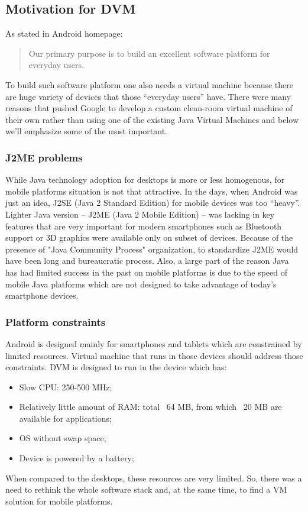 \documentclass[11pt, oneside]{article}   	%
\begin{document}
\subsection{Motivation for DVM}

As stated in Android homepage:
\begin{quotation}
Our primary purpose is to build an excellent software platform for everyday users\cite{website:androidphylosophy}.
\end{quotation}
To build such software platform one also needs a virtual machine because there are huge variety of devices that those ``everyday users'' have. There were many reasons that pushed Google to develop a custom clean-room virtual machine of their own rather than using one of the existing Java Virtual Machines and below we'll emphasize some of the most important.

\subsubsection{J2ME problems}

While Java technology adoption for desktops is more or less homogenous, for mobile platforms situation is not that attractive. In the days, when Android was just an idea, J2SE (Java 2 Standard Edition) for mobile devices was too ``heavy''. Lighter Java version -- J2ME (Java 2 Mobile Edition) -- was lacking in key features that are very important for modern smartphones such as Bluetooth support or 3D graphics were available only on subset of devices. Because of the presence of "Java Community Process" organization\cite{java_community_process}, to standardize J2ME would have been long and bureaucratic process. Also, a large part of the reason Java has had limited success in the past on mobile platforms is due to the speed of mobile Java platforms which are not designed to take advantage of today's smartphone devices. 

\subsubsection{Platform constraints}

Android is designed mainly for smartphones and tablets which are constrained by limited resources. Virtual machine that runs in those devices should address those constraints. DVM is designed to run in the device which has:
\begin{itemize}
\itemsep0em
  \item Slow CPU: 250-500 MHz;
  \item Relatively little amount of RAM: total ~64 MB, from which ~20 MB are available for applications;
  \item OS without swap space;
  \item Device is powered by a battery;
\end{itemize}
When compared to the desktops, these resources are very limited. So, there was a need to rethink the whole software stack and, at the same time, to find a VM solution for mobile platforms. 
\end{document}
